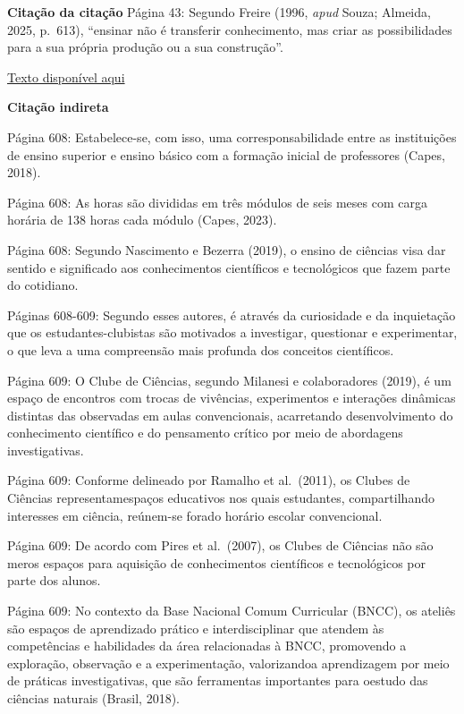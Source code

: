 \documentclass[
  letterpaper,
  DIV=11,
  numbers=noendperiod]{scrreprt}
\begin{document}
\textbf{Citação da citação} Página 43: Segundo Freire (1996, \emph{apud}
Souza; Almeida, 2025, p.~613), ``ensinar não é transferir conhecimento,
mas criar as possibilidades para a sua própria produção ou a sua
construção''.

\href{https://renbio.org.br/index.php/sbenbio/article/view/1347/497}{Texto
disponível aqui}

\textbf{Citação indireta}

Página 608: Estabelece-se, com isso, uma corresponsabilidade entre as
instituições de ensino superior e ensino básico com a formação inicial
de professores (Capes, 2018).

Página 608: As horas são divididas em três módulos de seis meses com
carga horária de 138 horas cada módulo (Capes, 2023).

Página 608: Segundo Nascimento e Bezerra (2019), o ensino de ciências
visa dar sentido e significado aos conhecimentos científicos e
tecnológicos que fazem parte do cotidiano.

Páginas 608-609: Segundo esses autores, é através da curiosidade e da
inquietação que os estudantes-clubistas são motivados a investigar,
questionar e experimentar, o que leva a uma compreensão mais profunda
dos conceitos científicos.

Página 609: O Clube de Ciências, segundo Milanesi e colaboradores
(2019), é um espaço de encontros com trocas de vivências, experimentos e
interações dinâmicas distintas das observadas em aulas convencionais,
acarretando desenvolvimento do conhecimento científico e do pensamento
crítico por meio de abordagens investigativas.

Página 609: Conforme delineado por Ramalho et al.~(2011), os Clubes de
Ciências representamespaços educativos nos quais estudantes,
compartilhando interesses em ciência, reúnem-se forado horário escolar
convencional.

Página 609: De acordo com Pires et al.~(2007), os Clubes de Ciências não
são meros espaços para aquisição de conhecimentos científicos e
tecnológicos por parte dos alunos.

Página 609: No contexto da Base Nacional Comum Curricular (BNCC), os
ateliês são espaços de aprendizado prático e interdisciplinar que
atendem às competências e habilidades da área relacionadas à BNCC,
promovendo a exploração, observação e a experimentação, valorizandoa
aprendizagem por meio de práticas investigativas, que são ferramentas
importantes para oestudo das ciências naturais (Brasil, 2018).
\end{document}
